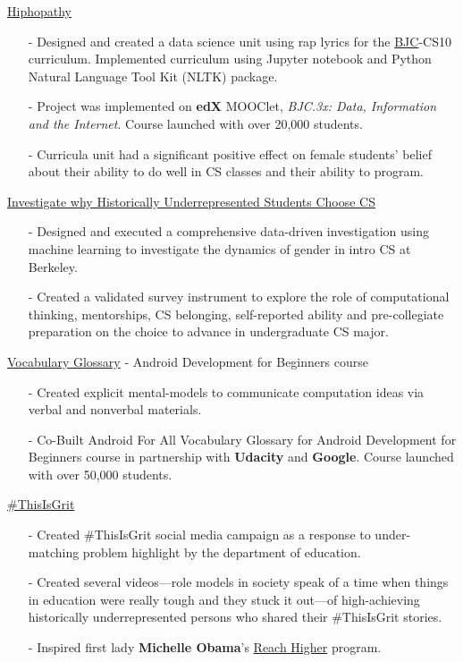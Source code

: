 \documentclass[11pt,article,oneside]{memoir}
\begin{document}
\ind \href{https://github.com/omoju/hiphopathy}{Hiphopathy}
\begin{itemize}[noitemsep,nolistsep]
\item[-] Designed and created a data science unit using rap lyrics for the \href{http://bjc.berkeley.edu/}{BJC}-CS10 curriculum. Implemented curriculum using Jupyter notebook and Python Natural Language Tool Kit (NLTK) package.
\item[-] Project was implemented on \textbf{edX} MOOClet, \textit{BJC.3x: Data, Information and the Internet}. Course launched with over 20,000 students.
\item[-] Curricula unit had a significant positive effect on female students' belief about their ability to do well in CS classes and their ability to program.
\end{itemize} 

\ind \href{https://github.com/omoju/investigatingWhyURMsChooseCS}{Investigate why Historically Underrepresented Students Choose CS}
\begin{itemize}[noitemsep,nolistsep]
\item[-] Designed and executed a comprehensive data-driven investigation using machine learning to investigate the dynamics of gender in intro CS at Berkeley.
\item[-] Created a validated survey instrument to explore the role of computational thinking, mentorships, CS belonging, self-reported ability and pre-collegiate preparation on the choice to advance in undergraduate CS major.  
\end{itemize} 

\ind \href{https://developers.google.com/android/for-all/vocab-words/}{Vocabulary Glossary} - Android Development for Beginners course
\begin{itemize}[noitemsep,nolistsep]
\item[-] Created explicit mental-models to communicate computation ideas via verbal and nonverbal materials.
\item[-] Co-Built Android For All Vocabulary Glossary for Android Development for Beginners course in partnership with \textbf{Udacity} and \textbf{Google}. Course launched with over 50,000 students.
\end{itemize} 

\ind \href{https://www.youtube.com/channel/UCZK66JujoN3KY3sak2kEa2w?&ab_channel=ThisIsGRIT}{\#ThisIsGrit}
\begin{itemize}[noitemsep,nolistsep]
\item[-] Created \#ThisIsGrit social media campaign as a response to under-matching problem highlight by the department of education.
\item[-] Created several videos---role models in society speak of a time when things in education were really tough and they stuck it out---of high-achieving historically underrepresented persons who shared their \#ThisIsGrit stories.
\item[-] Inspired first lady \textbf{Michelle Obama}'s \href{https://www.whitehouse.gov/reach-higher}{Reach Higher} program. 
\end{itemize} 
\end{document}
